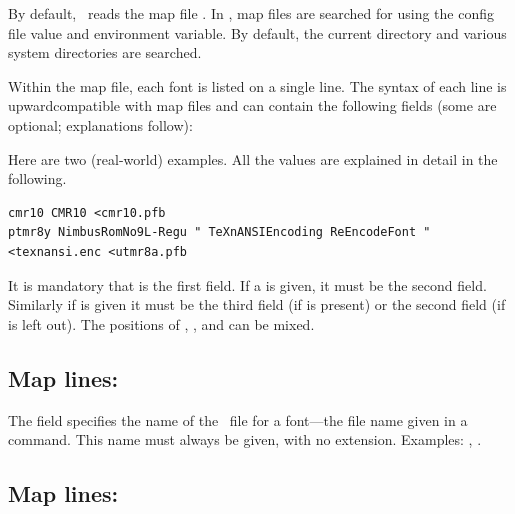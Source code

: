 \documentclass{pdftexmanual}
\begin{document}
By default, \PDFTEX\ reads the map file .  In \WEBC,
map files are searched for using the  config file value
and environment variable.  By default, the current directory and various
system directories are searched.

Within the map file, each font is listed on a single line.  The syntax of
each line is upward\hyph compatible with  map files and can contain
the following fields (some are optional; explanations follow):

\begin{quote}
\end{quote}

Here are two (real-world) examples. All the values are explained in
detail in the following.

{\small \begin{verbatim}
cmr10 CMR10 <cmr10.pfb
ptmr8y NimbusRomNo9L-Regu " TeXnANSIEncoding ReEncodeFont " <texnansi.enc <utmr8a.pfb
\end{verbatim}
\par %
}

It is mandatory that  is the first field. If a
 is given, it must be the second field. Similarly if
 is given it must be the third field (if
 is present) or the second field (if  is
left out). The positions of , ,
and  can be mixed.

\subsection{Map lines: }
\label{sec.map-tfmname}

The  field specifies the name of the \TFM\ file for a
font---the file name given in a \TEX\  command. This name must
always be given, with no extension. Examples: ,
.

\subsection{Map lines: }
\end{document}
